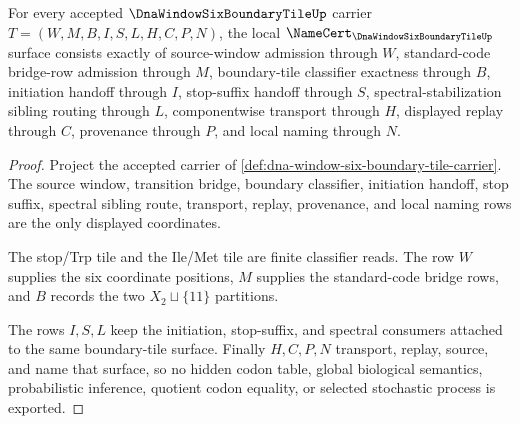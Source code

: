 \begin{theorem}
\label{thm:dna-window-six-boundary-tile-namecert-obligations}
For every accepted $\DnaWindowSixBoundaryTileUp$ carrier $T=(W,M,B,I,S,L,H,C,P,N)$, the local $\NameCert_{\DnaWindowSixBoundaryTileUp}$ surface consists exactly of source-window admission through $W$, standard-code bridge-row admission through $M$, boundary-tile classifier exactness through $B$, initiation handoff through $I$, stop-suffix handoff through $S$, spectral-stabilization sibling routing through $L$, componentwise transport through $H$, displayed replay through $C$, provenance through $P$, and local naming through $N$.
\end{theorem}
\begin{proof}
Project the accepted carrier of \autoref{def:dna-window-six-boundary-tile-carrier}. The source window, transition bridge, boundary classifier, initiation handoff, stop suffix, spectral sibling route, transport, replay, provenance, and local naming rows are the only displayed coordinates.

The stop/Trp tile and the Ile/Met tile are finite classifier reads. The row $W$ supplies the six coordinate positions, $M$ supplies the standard-code bridge rows, and $B$ records the two $X_2\sqcup\{11\}$ partitions.

The rows $I,S,L$ keep the initiation, stop-suffix, and spectral consumers attached to the same boundary-tile surface. Finally $H,C,P,N$ transport, replay, source, and name that surface, so no hidden codon table, global biological semantics, probabilistic inference, quotient codon equality, or selected stochastic process is exported.
\end{proof}

